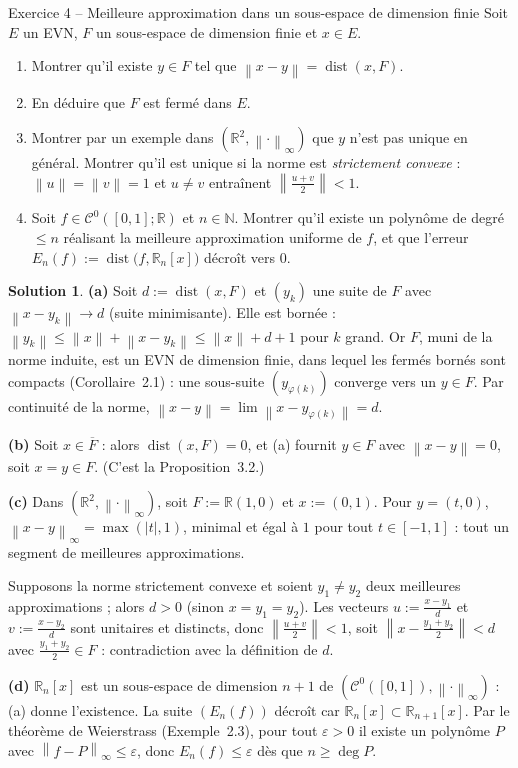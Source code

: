 \documentclass[11pt,a4paper]{article}
\newcommand{\R}{\mathbb{R}}
\newcommand{\N}{\mathbb{N}}
\newcommand{\adh}[1]{\overline{#1}}
\newcommand{\dist}{\operatorname{dist}}
\newcommand{\norm}[1]{\left\|#1\right\|}
\newcommand{\Cz}{\mathcal{C}^0}
\theoremstyle{definition}
\newtheorem*{solution}{Solution}
\begin{document}
\begin{exo}{Exercice 4 -- Meilleure approximation dans un sous-espace de dimension finie}
Soit $E$ un EVN, $F$ un sous-espace de dimension finie et $x\in E$.
\begin{enumerate}[label=(\alph*)]
  \item Montrer qu'il existe $y\in F$ tel que $\norm{x-y}=\dist(x,F)$.
  \item En déduire que $F$ est fermé dans $E$.
  \item Montrer par un exemple dans $(\R^2,\norm\cdot_\infty)$ que $y$ n'est pas unique en général. Montrer qu'il est unique si la norme est \emph{strictement convexe} : $\norm u=\norm v=1$ et $u\ne v$ entraînent $\norm{\frac{u+v}2}<1$.
  \item Soit $f\in\Cz([0,1];\R)$ et $n\in\N$. Montrer qu'il existe un polynôme de degré $\le n$ réalisant la meilleure approximation uniforme de $f$, et que l'erreur $E_n(f):=\dist\big(f,\R_n[x]\big)$ décroît vers $0$.
\end{enumerate}
\end{exo}

\begin{solution}
\noindent\textbf{(a)} Soit $d:=\dist(x,F)$ et $(y_k)$ une suite de $F$ avec $\norm{x-y_k}\to d$ (suite minimisante). Elle est bornée : $\norm{y_k}\le\norm x+\norm{x-y_k}\le\norm x+d+1$ pour $k$ grand. Or $F$, muni de la norme induite, est un EVN de dimension finie, dans lequel les fermés bornés sont compacts (Corollaire~2.1) : une sous-suite $(y_{\varphi(k)})$ converge vers un $y\in F$. Par continuité de la norme, $\norm{x-y}=\lim\norm{x-y_{\varphi(k)}}=d$.

\medskip
\noindent\textbf{(b)} Soit $x\in\adh F$ : alors $\dist(x,F)=0$, et (a) fournit $y\in F$ avec $\norm{x-y}=0$, soit $x=y\in F$. (C'est la Proposition~3.2.)

\medskip
\noindent\textbf{(c)} Dans $(\R^2,\norm\cdot_\infty)$, soit $F:=\R(1,0)$ et $x:=(0,1)$. Pour $y=(t,0)$, $\norm{x-y}_\infty=\max(|t|,1)$, minimal et égal à $1$ pour tout $t\in[-1,1]$ : tout un segment de meilleures approximations.

Supposons la norme strictement convexe et soient $y_1\ne y_2$ deux meilleures approximations ; alors $d>0$ (sinon $x=y_1=y_2$). Les vecteurs $u:=\frac{x-y_1}d$ et $v:=\frac{x-y_2}d$ sont unitaires et distincts, donc $\norm{\frac{u+v}2}<1$, soit $\norm{x-\frac{y_1+y_2}2}<d$ avec $\frac{y_1+y_2}2\in F$ : contradiction avec la définition de $d$.

\medskip
\noindent\textbf{(d)} $\R_n[x]$ est un sous-espace de dimension $n+1$ de $(\Cz([0,1]),\norm\cdot_\infty)$ : (a) donne l'existence. La suite $(E_n(f))$ décroît car $\R_n[x]\subset\R_{n+1}[x]$. Par le théorème de Weierstrass (Exemple~2.3), pour tout $\varepsilon>0$ il existe un polynôme $P$ avec $\norm{f-P}_\infty\le\varepsilon$, donc $E_n(f)\le\varepsilon$ dès que $n\ge\deg P$.
\end{solution}
\end{document}
